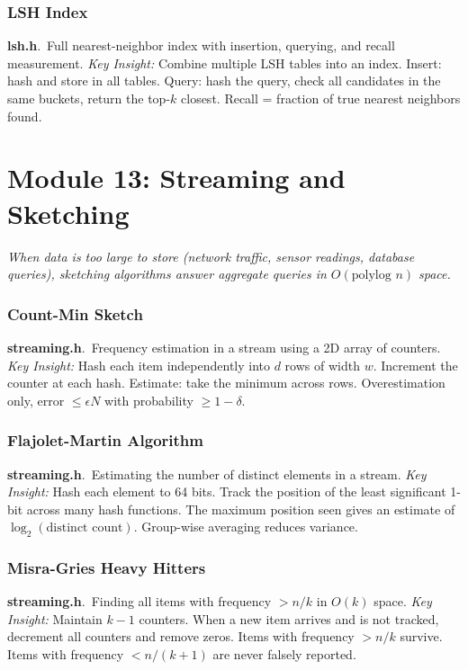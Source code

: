 \documentclass[11pt,a4paper]{article}
\newcommand{\algo}[2]{\textbf{#1}.\ #2}
\newcommand{\insight}{\textit{Key Insight: }}
\begin{document}
\subsubsection{LSH Index}
\algo{lsh.h}{Full nearest-neighbor index with insertion, querying, and recall measurement.}
\insight Combine multiple LSH tables into an index. Insert: hash and store in all tables. Query: hash the query, check all candidates in the same buckets, return the top-\(k\) closest. Recall = fraction of true nearest neighbors found.

\section{Module 13: Streaming and Sketching}
\label{sec:streaming}

\textit{When data is too large to store (network traffic, sensor readings, database queries), sketching algorithms answer aggregate queries in \(O(\text{polylog } n)\) space.}

\subsubsection{Count-Min Sketch}
\algo{streaming.h}{Frequency estimation in a stream using a 2D array of counters.}
\insight Hash each item independently into \(d\) rows of width \(w\). Increment the counter at each hash. Estimate: take the minimum across rows. Overestimation only, error \(\le \epsilon N\) with probability \(\ge 1 - \delta\).

\subsubsection{Flajolet-Martin Algorithm}
\algo{streaming.h}{Estimating the number of distinct elements in a stream.}
\insight Hash each element to 64 bits. Track the position of the least significant 1-bit across many hash functions. The maximum position seen gives an estimate of \(\log_2(\text{distinct count})\). Group-wise averaging reduces variance.

\subsubsection{Misra-Gries Heavy Hitters}
\algo{streaming.h}{Finding all items with frequency \(> n/k\) in \(O(k)\) space.}
\insight Maintain \(k-1\) counters. When a new item arrives and is not tracked, decrement all counters and remove zeros. Items with frequency \(> n/k\) survive. Items with frequency \(< n/(k+1)\) are never falsely reported.
\end{document}
